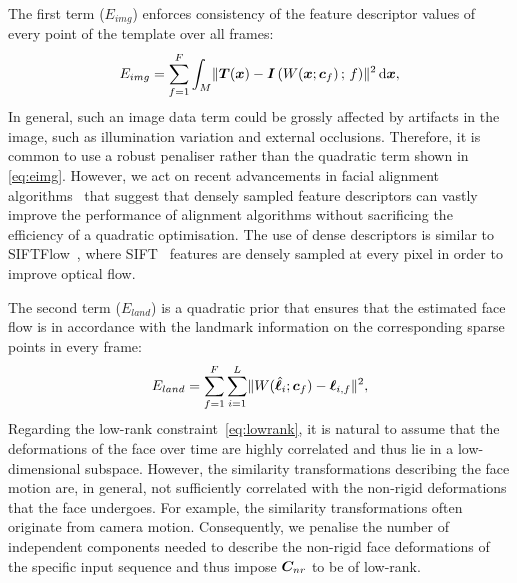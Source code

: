 The first term ($E_{img}$) enforces consistency of the feature descriptor values
of every point of the template over all frames:
\begin{equation}\label{eq:eimg}
    E_{img} = \sum_{f=1}^F \int_M  \lVert{} 
                \boldsymbol{T}(\boldsymbol{x}) -
               \boldsymbol{I}\left( W(\boldsymbol{x};\boldsymbol{c}_f) \,;\, f \right)
              \rVert^2  \, \mathrm{d} \boldsymbol{x},
\end{equation}
In general, such an image data term could be grossly affected by artifacts in the 
image, such as illumination variation and external occlusions. Therefore, it is
common to use a robust penaliser rather than the quadratic term shown in 
\cref{eq:eimg}. However, we act on recent advancements in facial alignment 
algorithms~\cite{antonakos2015feature} that suggest that densely 
sampled feature descriptors can vastly improve the performance of alignment
algorithms without sacrificing the efficiency of a quadratic optimisation.
The use of dense descriptors is similar to SIFTFlow~\cite{liu2011sift}, where 
SIFT~\cite{lowe2004distinctive} features are densely sampled at every pixel in order
to improve optical flow.

The second term ($E_{land}$) is a quadratic prior that ensures that the estimated
face flow is in accordance with the landmark information on the corresponding
sparse points in every frame:
\begin{equation}
    E_{land} = \sum_{f=1}^F \sum_{i=1}^L \lVert{} 
                    W(\hat{\boldsymbol{\ell}}_i;\boldsymbol{c}_f) - \boldsymbol{\ell}_{i,f}
                 \rVert^2,
\end{equation}
Regarding the low-rank constraint~\cref{eq:lowrank}, it is natural to assume that the deformations
of the face over time are highly correlated and thus lie in a low-dimensional subspace.
However, the similarity transformations describing the face motion are, in general, not 
sufficiently correlated with the non-rigid deformations that the face undergoes. For example,
the similarity transformations often originate from camera motion. Consequently, we penalise the number of 
independent components needed to describe the non-rigid face deformations of the specific input 
sequence and thus impose $\boldsymbol{C}_{nr}$ to be of low-rank.
